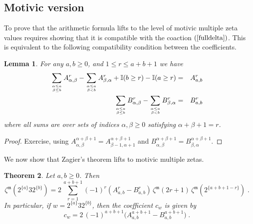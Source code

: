 \documentclass[10pt]{amsart}
\newtheorem{thm}{Theorem}[section]
\newtheorem{lem}[thm]{Lemma}
\theoremstyle{definition}
\theoremstyle{remark}
\numberwithin{equation}{section}
\newcommand{\zetam}{\zeta^{ \mathfrak{m}}}
\begin{document}
 
 \subsection{Motivic version}  To prove that the arithmetic formula lifts to the level of motivic multiple zeta values  requires showing that it is compatible with the coaction $(\ref{fulldelta})$. This  
is equivalent to the following compatibility condition between the coefficients.
 
 \begin{lem}\label{lemcollapse}
For any $a,b\geq0$,  and $1\leq r\leq a+b+1$ we have
\begin{eqnarray} 
 \sum_{{\alpha\leq a \atop \beta \leq b}}  A^{r}_{\alpha,\beta}   - \sum_{\alpha \leq a \atop \beta< b} A^{r}_{\beta,\alpha} +    \mathbb{I}(b\geq r) -  \mathbb{I}(a\geq r)  & = & A^{r}_{a,b} \nonumber \\
  \sum_{{\alpha\leq a \atop \beta \leq b}}  B^{r}_{\alpha,\beta}   - \sum_{\alpha \leq a \atop \beta< b} B^{r}_{\beta,\alpha}   & = & B^{r}_{a,b} \nonumber
\end{eqnarray}
where all sums are over sets of indices $\alpha,\beta\geq0$ satisfying $\alpha+\beta+1=r$.
\end{lem}
\begin{proof} Exercise, using  
 $A^{\alpha+\beta+1}_{\alpha,\beta} = A^{\alpha+\beta+1}_{\beta-1,\alpha+1}$   and $B^{\alpha+\beta+1}_{\alpha,\beta}=B^{\alpha+\beta+1}_{\beta,\alpha}$.
 \end{proof}
We now show that Zagier's theorem lifts to  motivic multiple zetas.
\begin{thm} \label{thmMotZagier} Let $a,b\geq 0$. Then 
\begin{equation} \label{zl1motform} \zetam(2^{\{a\}}32^{\{b\}})=  2\,\sum_{r=1}^{a+b+1}(-1)^r (A^r_{a,b}-B^r_{a,b})\,  \zetam(2r+1)\, \zetam(2^{\{a+b+1-r\}})\;. 
\end{equation}
In particular, if $w=2^{\{a\}}32^{\{b\}}$, then the coefficient $c_w$ is given by
\begin{equation}\label{cwformula}
c_w =   2\, (-1)^{a+b+1} \big( A^{a+b+1}_{a,b}-B^{a+b+1}_{a,b}\big)\;. 
\end{equation}
\end{thm}
\end{document}
